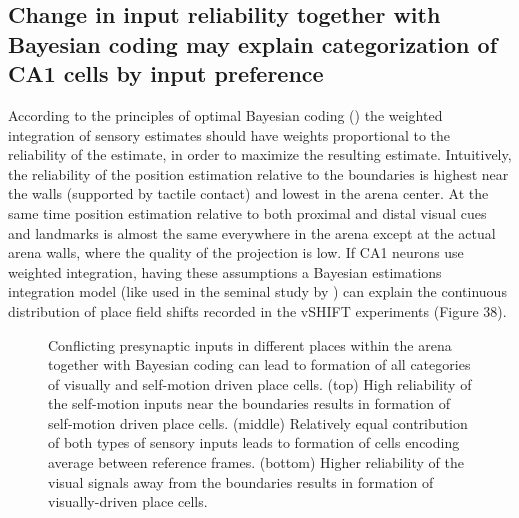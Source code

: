 \subsection{Change in input reliability together with Bayesian coding may explain categorization of CA1 cells by input preference}

According to the principles of optimal Bayesian coding (\cite{Pouget2003}) the weighted integration of sensory estimates should have weights proportional to the reliability of the estimate, in order to maximize the resulting estimate. Intuitively, the reliability of the position estimation relative to the boundaries is highest near the walls (supported by tactile contact) and lowest in the arena center. At the same time position estimation relative to both proximal and distal visual cues and landmarks is almost the same everywhere in the arena except at the actual arena walls, where the quality of the projection is low. If CA1 neurons use weighted integration, having these assumptions a Bayesian estimations integration model (like used in the seminal study by \cite{Ernst2002}) can explain the continuous distribution of place field shifts recorded in the vSHIFT experiments (Figure 38).

\begin{figure}
\captionsetup{format=plain}
\caption[Weighted integration]{
Conflicting presynaptic inputs in different places within the arena together with Bayesian coding can lead to formation of all categories of visually and self-motion driven place cells. (top) High reliability of the self-motion inputs near the boundaries results in formation of self-motion driven place cells. (middle) Relatively equal contribution of both types of sensory inputs leads to formation of cells encoding average between reference frames. (bottom) Higher reliability of the visual signals away from the boundaries results in formation of visually-driven place cells.
}
\label{fig:F38_weighted_integration}
\end{figure}

